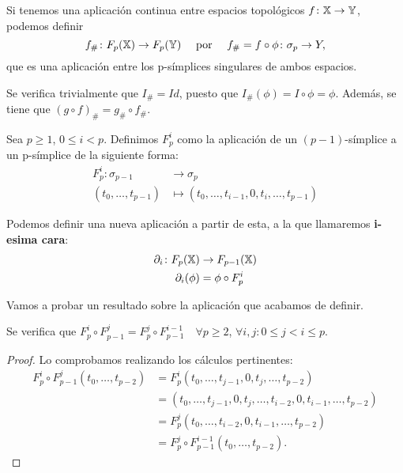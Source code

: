 Si tenemos una aplicación continua entre espacios topológicos $f \colon {\mathbb X} \to {\mathbb Y}$, podemos definir
\[f_{\#} \colon F_{p}({\mathbb X}) \to F_{p}({\mathbb Y})  \quad \text{ por }  \quad f_{\#} = f \circ \phi \colon \sigma_p \to Y, \]
que es una aplicación entre los p-símplices singulares de ambos espacios.

Se verifica trivialmente que $I_\# = Id$, puesto que $I_\#(\phi) = I \circ \phi = \phi$.
Además, se tiene que $(g \circ f)_\# = g_\# \circ f_\#$.

\begin{definition}
  Sea $p \geq 1$, $0 \leq i < p$. Definimos $F_p^i$ como la aplicación de un $(p-1)$-símplice a un p-símplice de la siguiente forma:
  \begin{align*}
    F_p^i \colon \sigma_{p-1} &\to \sigma_p\\
    (t_0, \dots, t_{p-1}) &\mapsto (t_0, \dots, t_{i-1}, 0, t_i, \dots, t_{p-1})
  \end{align*}

  Podemos definir una nueva aplicación a partir de esta, a la que llamaremos \textbf{i-esima cara}:
  \begin{align*}
    \partial_i \colon F_{p}({\mathbb X}) &\to F_{p-1}({\mathbb X})\\
    \partial_i(\phi) &= \phi \circ F_p^i
  \end{align*}
\end{definition}

Vamos a probar un resultado sobre la aplicación que acabamos de definir.

\begin{lemma}
  Se verifica que $F_p^i \circ F_{p-1}^j = F_p^j \circ F_{p-1}^{i-1} \quad \forall p \geq 2$, $\forall i, j \colon 0 \leq j < i \leq p$.
\end{lemma}

\begin{proof}
Lo comprobamos realizando los cálculos pertinentes:
  \begin{align*}
    F_p^i \circ F_{p-1}^j (t_0, \dots, t_{p-2}) &= F_p^i (t_0, \dots, t_{j-1}, 0, t_j, \dots, t_{p-2}) \\
    &= (t_0, \dots, t_{j-1}, 0, t_j, \dots, t_{i-2}, 0, t_{i-1}, \dots, t_{p-2}) \\
    &= F_p^j (t_0, \dots, t_{i-2}, 0, t_{i-1}, \dots, t_{p-2}) \\
    &= F_p^j \circ F_{p-1}^{i-1} (t_0, \dots, t_{p-2}).
  \end{align*}
\end{proof}

